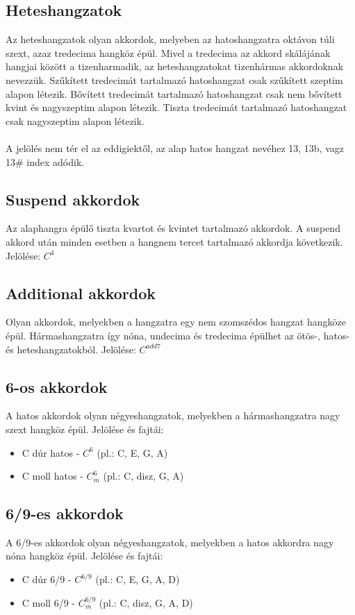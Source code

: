 \subsection{Heteshangzatok}
Az heteshangzatok olyan akkordok, melyeben az hatoshangzatra oktávon túli szext, azaz tredecima hangköz épül.
Mivel a tredecima az akkord skálájának hangjai között a tizenharmadik, az heteshangzatokat tizenhármas akkordoknak nevezzük.
Szűkített tredecimát tartalmazó hatoshangzat csak szűkített szeptim alapon létezik.
Bővített tredecimát tartalmazó hatoshangzat csak nem bővített kvint és nagyszeptim alapon létezik.
Tiszta tredecimát tartalmazó hatoshangzat csak nagyszeptim alapon létezik. \\\\
A jelölés nem tér el az eddigiektől, az alap hatos hangzat nevéhez 13, 13b, vagz 13\# index adódik.

\subsection{Suspend akkordok}
Az alaphangra épülő tiszta kvartot és kvintet tartalmazó akkordok. 
A suspend akkord után minden esetben a hangnem tercet tartalmazó akkordja következik.
Jelölése: $C^4$

\subsection{Additional akkordok}
Olyan akkordok, melyekben a hangzatra egy nem szomszédos hangzat hangköze épül.
Hármashangzatra így nóna, undecima és tredecima épülhet az ötös-, hatos- és heteshangzatokból.
Jelölése: $C^{add7}$

\subsection{6-os akkordok}
A hatos akkordok olyan négyeshangzatok, melyekben a hármashangzatra nagy szext hangköz épül.
Jelölése és fajtái:
\begin{itemize}
\item C dúr hatos - $C^6$ (pl.: C, E, G, A)
\item C moll hatos - $C_m^6$ (pl.: C, disz, G, A)
\end{itemize}

\subsection{6/9-es akkordok}
A 6/9-es akkordok olyan négyeshangzatok, melyekben a hatos akkordra nagy nóna hangköz épül.
Jelölése és fajtái:
\begin{itemize}
\item C dúr 6/9 - $C^{6/9}$ (pl.: C, E, G, A, D)
\item C moll 6/9 - $C_m^{6/9}$ (pl.: C, disz, G, A, D)
\end{itemize}


